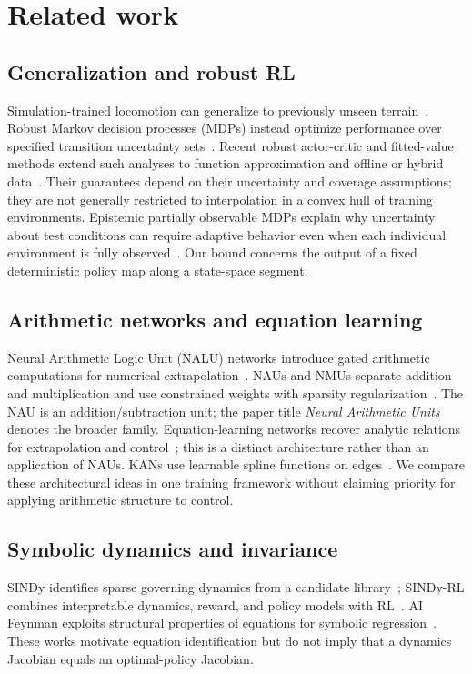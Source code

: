 \documentclass[10pt]{article}
\begin{document}
\section{Related work}

\subsection{Generalization and robust RL}
Simulation-trained locomotion can generalize to previously unseen terrain~\cite{Lee2020ESCP}. Robust Markov decision processes (MDPs) instead optimize performance over specified transition uncertainty sets~\cite{Wiesemann2013RobustMDP,Iyengar2005RobustDP}. Recent robust actor-critic and fitted-value methods extend such analyses to function approximation and offline or hybrid data~\cite{Zhou2023NaturalActorCritic,Panaganti2024RobustF}. Their guarantees depend on their uncertainty and coverage assumptions; they are not generally restricted to interpolation in a convex hull of training environments. Epistemic partially observable MDPs explain why uncertainty about test conditions can require adaptive behavior even when each individual environment is fully observed~\cite{Ghosh2021EpistemicPOMDP}. Our bound concerns the output of a fixed deterministic policy map along a state-space segment.

\subsection{Arithmetic networks and equation learning}
Neural Arithmetic Logic Unit (NALU) networks introduce gated arithmetic computations for numerical extrapolation~\cite{Trask2018NALU}. NAUs and NMUs separate addition and multiplication and use constrained weights with sparsity regularization~\cite{Madsen2020NAU}. The NAU is an addition/subtraction unit; the paper title \emph{Neural Arithmetic Units} denotes the broader family. Equation-learning networks recover analytic relations for extrapolation and control~\cite{Sahoo2018LearningEquations}; this is a distinct architecture rather than an application of NAUs. KANs use learnable spline functions on edges~\cite{Liu2024KAN}. We compare these architectural ideas in one training framework without claiming priority for applying arithmetic structure to control.

\subsection{Symbolic dynamics and invariance}
SINDy identifies sparse governing dynamics from a candidate library~\cite{Brunton2016SINDy}; SINDy-RL combines interpretable dynamics, reward, and policy models with RL~\cite{Zolman2025SINDyRL}. AI Feynman exploits structural properties of equations for symbolic regression~\cite{Udrescu2020AIFeynman}. These works motivate equation identification but do not imply that a dynamics Jacobian equals an optimal-policy Jacobian.
\end{document}
